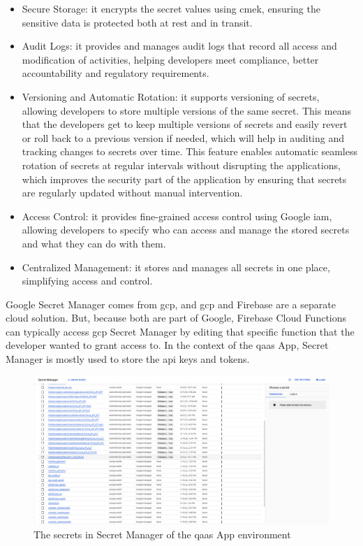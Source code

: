 \begin{itemize}
      \item Secure Storage: it encrypts the secret values using \acrshort{cmek}, ensuring the sensitive data is protected
            both at rest and in transit.
      \item Audit Logs: it provides and manages audit logs that record all access and modification of activities, helping
            developers meet compliance, better accountability and regulatory requirements.
      \item Versioning and Automatic Rotation: it supports versioning of secrets, allowing developers to store multiple versions
            of the same secret. This means that the developers get to keep multiple versions of secrets and easily revert or roll
            back to a previous version if needed, which will help in auditing and tracking changes to secrets over time. This feature
            enables automatic seamless rotation of secrets at regular intervals without  disrupting the applications, which improves
            the security part of the application by ensuring that secrets are regularly updated without manual intervention.
      \item Access Control: it provides fine-grained access control using Google \acrshort{iam}, allowing developers to specify
            who can access and manage the stored secrets and what they can do with them.
      \item Centralized Management: it stores and manages all secrets in one place, simplifying access and control.
\end{itemize}

Google Secret Manager comes from \acrshort{gcp}, and \acrshort{gcp} and Firebase are a separate cloud solution. But, because
both are part of Google, Firebase Cloud Functions can typically access \acrshort{gcp} Secret Manager by editing that specific function
that the developer wanted to grant access to. In the context of the \acrshort{qaas} App, Secret Manager is mostly used to store the
\acrshort{api} keys and tokens.

\begin{figure}[H]
      \centering
      \includegraphics[width=1.0\textwidth]{Figures/Secret Manager.png}
      \caption{The secrets in Secret Manager of the \acrshort{qaas} App environment}
\end{figure}

